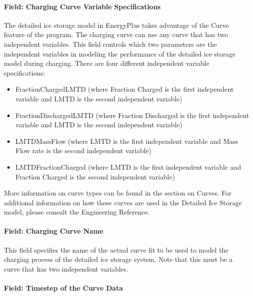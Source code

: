 \paragraph{Field: Charging Curve Variable Specifications}\label{field-charging-curve-variable-specifications}

The detailed ice storage model in EnergyPlus takes advantage of the Curve feature of the program.  The charging curve can use any curve that has two independent variables.  This field controls which two parameters are the independent variables in modeling the performance of the detailed ice storage model during charging. There are four different independent variable specifications:


\begin{itemize}
\item
FractionChargedLMTD (where Fraction Charged is the first independent variable and LMTD is the second independent variable)
\item
FractionDischargedLMTD (where Fraction Discharged is the first independent variable and LMTD is the second independent variable)
\item
LMTDMassFlow (where LMTD is the first independent variable and Mass Flow rate is the second independent variable)
\item
LMTDFractionCharged (where LMTD is the first independent variable and Fraction Charged is the second independent variable)
\end{itemize}

More information on curve types can be found in the section on Curves.  For additional information on how these curves are used in the Detailed Ice Storage model, please consult the Engineering Reference.

\paragraph{Field: Charging Curve Name}\label{field-charging-curve-name}

This field specifies the name of the actual curve fit to be used to model the charging process of the detailed ice storage system. Note that this must be a curve that has two independent variables.

\paragraph{Field: Timestep of the Curve Data}\label{field-timestep-of-the-curve-data}

